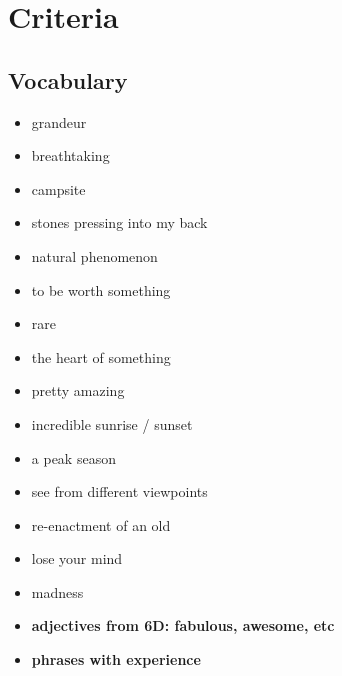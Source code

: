 \documentclass[12pt, a4paper]{article}
\begin{document}
\section{Criteria}
\subsection{Vocabulary}
\begin{itemize}
    \item grandeur
    \item breathtaking
    \item campsite
    \item stones pressing into my back
    \item natural phenomenon
    \item to be worth something
    \item rare
    \item the heart of something
    \item pretty amazing
    \item incredible sunrise / sunset
    \item a peak season
    \item see from different viewpoints
    \item re-enactment of an old
    \item lose your mind
    \item madness
    \item \textbf{adjectives from 6D: fabulous, awesome, etc}
    \item \textbf{phrases with experience}
\end{itemize}

\newpage
\end{document}
